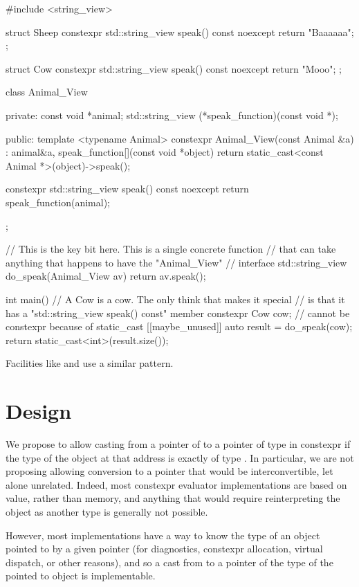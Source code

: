 \documentclass{wg21}
\begin{document}
\begin{colorblock}
#include <string_view>

struct Sheep {
    constexpr std::string_view speak() const noexcept { return "Baaaaaa"; }
};

struct Cow {
    constexpr std::string_view speak() const noexcept { return "Mooo"; }
};

class Animal_View {
    private:
    const void *animal;
    std::string_view (*speak_function)(const void *);

    public:
    template <typename Animal>
    constexpr Animal_View(const Animal &a)
    : animal{&a}, speak_function{[](const void *object) {
            return static_cast<const Animal *>(object)->speak();
    }} {}

    constexpr std::string_view speak() const noexcept {
        return speak_function(animal);
    }
};

// This is the key bit here. This is a single concrete function
// that can take anything that happens to have the "Animal_View"
// interface
std::string_view do_speak(Animal_View av) { return av.speak(); }

int main() {
    // A Cow is a cow. The only think that makes it special
    // is that it has a "std::string_view speak() const" member
    constexpr Cow cow;
    // cannot be constexpr because of static_cast
    [[maybe_unused]] auto result = do_speak(cow);
    return static_cast<int>(result.size());
}
\end{colorblock}

Facilities like  and  use a similar pattern.

\section{Design}

We propose to allow casting from a pointer of  to a pointer of type  in constexpr if the type of the object at that address is exactly of type .
In particular, we are not proposing allowing conversion to a pointer that would be interconvertible, let alone unrelated.
Indeed, most constexpr evaluator implementations are based on value, rather than memory, and anything that would require reinterpreting the object as another type is generally not possible.

However, most implementations have a way to know the type of an object pointed to by a given pointer (for diagnostics, constexpr allocation, virtual dispatch, or other reasons), and so a cast from  to a pointer of the type of the pointed to object is implementable.
\end{document}
